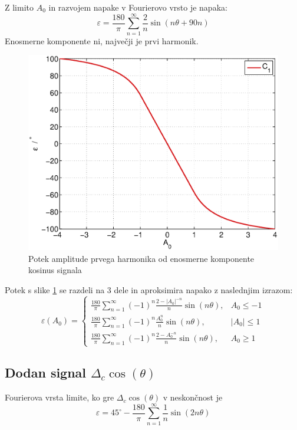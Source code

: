 \documentclass[a4paper]{article}
\begin{document}
Z limito $A_0$ in razvojem napake v Fourierovo vrsto je napaka:
\begin{equation}
\label{equ:off_lim_vrsta}
\varepsilon = \frac{180}{\pi}\sum_{n=1}^{\infty}\frac{2}{n} \sin (n \theta+ 90 n)
\end{equation}
Enosmerne komponente ni,  največji je prvi harmonik.
\begin{figure}[!htb]
	\begin{center}
		\includegraphics[width=\linewidth]{./Slike/off.eps}
		\caption{Potek amplitude prvega harmonika od enosmerne komponente kosinus signala} \label{fig:off}
	\end{center}
\end{figure}
Potek s slike \ref{fig:off} se razdeli na 3 dele in aproksimira napako z naslednjim izrazom:
\begin{equation}
\label{equ:cos_err}
\varepsilon(A_0)=
\begin{cases}
\frac{180}{\pi}\sum_{n=1}^{\infty}(-1)^n\frac{2-|A_0|^{-n}}{n} \sin (n \theta ), & A_0\leq -1 \\
\frac{180}{\pi}\sum_{n=1}^{\infty}(-1)^n\frac{A_0^n}{n} \sin (n \theta ), & |A_0|\leq 1 \\
\frac{180}{\pi}\sum_{n=1}^{\infty}(-1)^n\frac{2-A_0^{-n}}{n} \sin (n \theta ), & A_0\geq 1
\end{cases}
\end{equation}

\subsection{Dodan signal $\Delta_c \cos(\theta)$}
Fourierova vrsta limite, ko gre $\Delta_c \cos(\theta)$ v neskončnost je
\begin{equation}
\label{equ:lim_dc_vrsta}
\varepsilon = 45^\circ -\frac{180}{\pi}\sum_{n=1}^{\infty}\frac{1}{n} \sin( 2 n \theta)
\end{equation}
\end{document}

